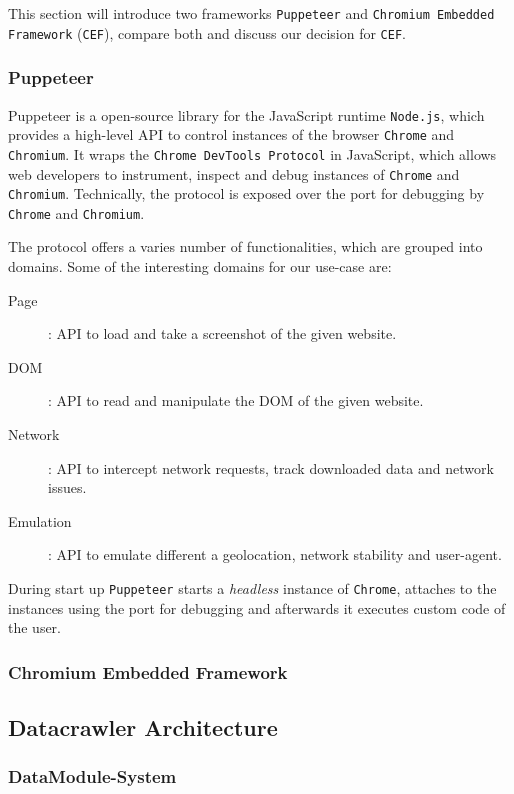 This section will introduce two frameworks \texttt{Puppeteer} and \texttt{Chromium Embedded Framework} (\texttt{CEF}), compare both and discuss our decision for \texttt{CEF}.

\subsubsection{Puppeteer}
Puppeteer is a open-source library for the JavaScript runtime \texttt{Node.js}, which provides a high-level API to control instances of the browser \texttt{Chrome} and \texttt{Chromium}. It wraps the \texttt{Chrome DevTools Protocol} in JavaScript, which allows web developers to instrument, inspect and debug instances of \texttt{Chrome} and \texttt{Chromium}. Technically, the protocol is exposed over the port for debugging by \texttt{Chrome} and \texttt{Chromium}.

The protocol offers a varies number of functionalities, which are grouped into domains. Some of the interesting domains for our use-case are:
\begin{description}
	\item[Page]: API to load and take a screenshot of the given website.
	\item[DOM]: API to read and manipulate the DOM of the given website.
	\item[Network]: API to intercept network requests, track downloaded data and network issues.
	\item[Emulation]: API to emulate different a geolocation, network stability and user-agent.
\end{description}

During start up \texttt{Puppeteer} starts a \textit{headless} instance of \texttt{Chrome}, attaches to the instances using the port for debugging and afterwards it executes custom code of the user.
\subsubsection{Chromium Embedded Framework}
\subsection{Datacrawler Architecture}
\label{datacrawler_architecture}

\subsubsection{DataModule-System}
\label{datacrawler_datamodulesystem}

